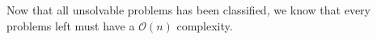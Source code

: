 Now that all unsolvable problems has been classified, we know that every problems left must have a $\mathcal{O}(n)$ complexity.